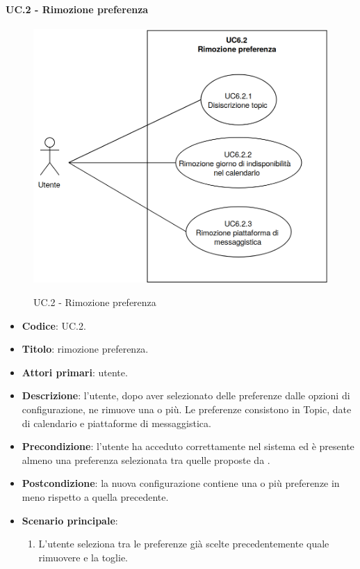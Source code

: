	\paragraph{UC\theuccount.2 - Rimozione preferenza}
		\begin{figure}[H]
			\centering
			\includegraphics[width=\columnwidth]{img/UC6_2.png}\\
			\caption{UC\theuccount.2 - Rimozione preferenza}
		\end{figure}
	\begin{itemize}
		\item \textbf{Codice}: UC\theuccount.2.
		\item \textbf{Titolo}: rimozione preferenza.
		\item \textbf{Attori primari}: utente.
		\item \textbf{Descrizione}: l'utente, dopo aver selezionato delle preferenze dalle opzioni di configurazione, ne rimuove una o più. Le preferenze consistono in Topic, date di calendario e piattaforme di messaggistica.
		\item \textbf{Precondizione}: l'utente ha acceduto correttamente nel sistema ed è presente almeno una preferenza selezionata tra quelle proposte da \progetto.
		\item \textbf{Postcondizione}: la nuova configurazione contiene una o più preferenze in meno rispetto a quella precedente.
		\item \textbf{Scenario principale}:
		\begin{enumerate}
			\item L'utente seleziona tra le preferenze già scelte precedentemente quale rimuovere e la toglie.
		\end{enumerate}
	\end{itemize}
	
